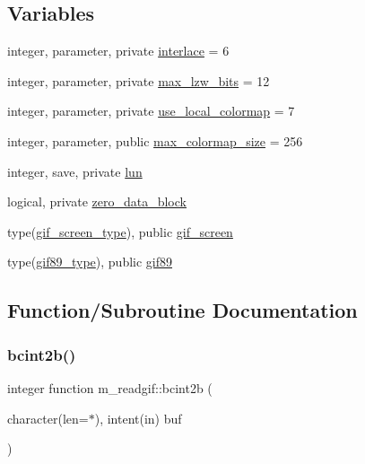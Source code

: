 \subsection*{Variables}
\begin{DoxyCompactItemize}
\item 
integer, parameter, private \mbox{\hyperlink{namespacem__readgif_af71b0131b0327843ab00d56288f1e4a3}{interlace}} = 6
\item 
integer, parameter, private \mbox{\hyperlink{namespacem__readgif_a42041a4cc2179d606ca9a1df44a797fe}{max\+\_\+lzw\+\_\+bits}} = 12
\item 
integer, parameter, private \mbox{\hyperlink{namespacem__readgif_abfef407c9bbae736ddf82dd2f5cc0dbc}{use\+\_\+local\+\_\+colormap}} = 7
\item 
integer, parameter, public \mbox{\hyperlink{namespacem__readgif_a6bce6231298ac3b8c0fe89169eacf790}{max\+\_\+colormap\+\_\+size}} = 256
\item 
integer, save, private \mbox{\hyperlink{namespacem__readgif_ae5e05cba63ef3a16c27f9935d6c2a24d}{lun}}
\item 
logical, private \mbox{\hyperlink{namespacem__readgif_a3d4f20ed4d02e7e260b5e0bcae642ddd}{zero\+\_\+data\+\_\+block}}
\item 
type(\mbox{\hyperlink{structm__readgif_1_1gif__screen__type}{gif\+\_\+screen\+\_\+type}}), public \mbox{\hyperlink{namespacem__readgif_a6253fc469a2750e1d59bc498bca3d6eb}{gif\+\_\+screen}}
\item 
type(\mbox{\hyperlink{structm__readgif_1_1gif89__type}{gif89\+\_\+type}}), public \mbox{\hyperlink{namespacem__readgif_a1d5a3f008ce6a2b13029a0977dba1aa1}{gif89}}
\end{DoxyCompactItemize}


\subsection{Function/\+Subroutine Documentation}
\mbox{\label{namespacem__readgif_a38594ce718f97f844771250edcd5e496}} 
\subsubsection{\texorpdfstring{bcint2b()}{bcint2b()}}
{\footnotesize\ttfamily integer function m\+\_\+readgif\+::bcint2b (\begin{DoxyParamCaption}\item[{character(len=$\ast$), intent(in)}]{buf }\end{DoxyParamCaption})\hspace{0.3cm}{\ttfamily [private]}}


